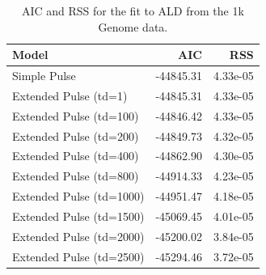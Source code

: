 \documentclass[11pt]{article}
\begin{document}
\begin{table}[H]

\caption{\label{tab:tableSReadl_data_AIC_RSS} AIC and RSS for the fit  to ALD from the 1k Genome data.}
\centering
\begin{tabular}[t]{l|r|r}
\hline
Model & AIC & RSS\\
\hline
Simple Pulse & -44845.31 & 4.33e-05\\
\hline
Extended Pulse (td=1) & -44845.31 & 4.33e-05\\
\hline
Extended Pulse (td=100) & -44846.42 & 4.33e-05\\
\hline
Extended Pulse (td=200) & -44849.73 & 4.32e-05\\
\hline
Extended Pulse (td=400) & -44862.90 & 4.30e-05\\
\hline
Extended Pulse (td=800) & -44914.33 & 4.23e-05\\
\hline
Extended Pulse (td=1000) & -44951.47 & 4.18e-05\\
\hline
Extended Pulse (td=1500) & -45069.45 & 4.01e-05\\
\hline
Extended Pulse (td=2000) & -45200.02 & 3.84e-05\\
\hline
Extended Pulse (td=2500) & -45294.46 & 3.72e-05\\
\hline
\end{tabular}
\end{table}
\end{document}
